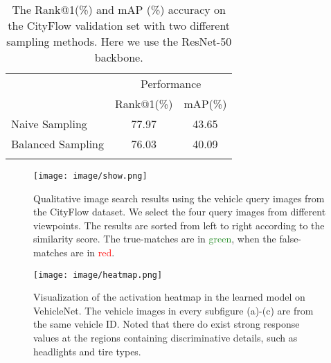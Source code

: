 \documentclass[journal]{IEEEtran}
\newcommand{\zznote}[1]{\textcolor{black}{#1}}
\begin{document}
\begin{table}
\caption{The Rank@1(\%) and mAP (\%) accuracy on the CityFlow validation set with two different sampling methods. Here we use the ResNet-50 backbone.}
\label{table:sample}
\vspace{-.2in}
\begin{center}
{
\setlength{\tabcolsep}{10pt}
\begin{tabular}{l|c c}
\shline
\zznote{\multirow{2}{*}{Sampling Policy}} & \multicolumn{2}{c}{Performance}\\
  & Rank@1(\%) & mAP(\%) \\
\hline
Naive Sampling & 77.97  & 43.65 \\
Balanced Sampling  & 76.03 & 40.09 \\
\shline
\end{tabular}}
\end{center}
\vspace{-.1in}
\end{table}

\begin{figure}[t]
\begin{center}
\texttt{[image: image/show.png]}
\end{center}
\vspace{-.2in}
   \caption{Qualitative image search results using the vehicle query images from the CityFlow dataset. We select the four query images from different viewpoints. The results are sorted from left to right according to the similarity score. The true-matches are in \textcolor{ForestGreen}{green}, when the false-matches are in \textcolor{red}{red}. }
\label{fig:show}
\end{figure}

\begin{figure}[t]
\begin{center}
\texttt{[image: image/heatmap.png]}
\end{center}
\vspace{-.2in}
   \caption{Visualization of the activation heatmap in the learned model on VehicleNet. The vehicle images in every subfigure (a)-(c) are from the same vehicle ID. Noted that there do exist strong response values at the regions containing discriminative details, such as headlights and tire types. }
\label{fig:heatmap}
\vspace{-.1in}
\end{figure}
\end{document}
